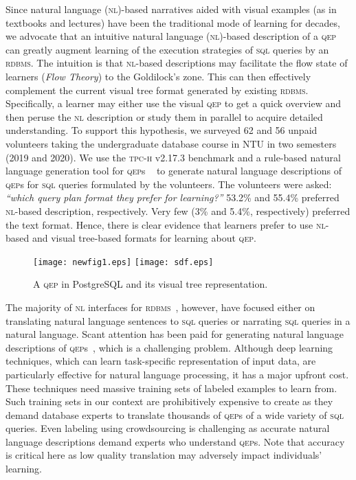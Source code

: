 \documentclass[11pt]{article}
\begin{document}
Since natural language (\textsc{nl})-based narratives aided with visual examples (as in textbooks and lectures) have been the traditional mode of learning for decades, we advocate that an  intuitive natural language (\textsc{nl})-based description of a \textsc{qep} can greatly augment learning of the execution strategies of \textsc{sql} queries by an \textsc{rdbms}. The intuition is that \textsc{nl}-based descriptions may facilitate the flow state of learners (\textit{Flow Theory}) to the Goldilock's zone. This can then effectively complement the current visual tree format generated by existing  \textsc{rdbms}.  Specifically, a learner may either use the visual \textsc{qep} to get a quick overview and then peruse the \textsc{nl} description or study them in parallel to acquire detailed understanding. To support this hypothesis, we surveyed 62 and 56 unpaid volunteers taking the undergraduate database course in NTU in two semesters (2019 and 2020).  We use the \textsc{tpc-h} v2.17.3 benchmark  and a  rule-based natural language generation tool for \textsc{qep}s ~\cite{neuron} to generate natural language descriptions of \textsc{qep}s for \textsc{sql} queries formulated by the volunteers.  The volunteers were asked: \textit{``which query plan format they prefer for learning?''} 53.2\% and 55.4\% preferred \textsc{nl}-based description, respectively. Very few (3\% and 5.4\%, respectively) preferred the text format. Hence, there is clear evidence that learners prefer to use \textsc{nl}-based and visual tree-based formats for learning about \textsc{qep}.

\begin{figure}[t]
\centering
\texttt{[image: newfig1.eps]}
\texttt{[image: sdf.eps]}
\vspace{0ex}\caption{A \textsc{qep} in PostgreSQL and its visual tree representation.}
\label{fig:plan}
\vspace{0ex}\end{figure}


The majority of \textsc{nl} interfaces for \textsc{rdbms}~\cite{KS+20}, however, have focused either on translating natural language sentences to \textsc{sql} queries or narrating \textsc{sql} queries in a natural language. Scant attention has been paid for generating natural language descriptions of \textsc{qep}s~\cite{neuron,lantern}, which is a challenging problem.
Although deep learning techniques, which can learn task-specific representation of input data, are particularly effective for natural language processing, it has a major upfront cost. These techniques need massive training sets  of labeled examples to learn from. Such training sets in our context are prohibitively expensive to create as they demand database experts to translate thousands of \textsc{qep}s of a wide variety of \textsc{sql} queries.  Even  labeling using crowdsourcing is challenging as accurate natural language descriptions demand experts who understand \textsc{qep}s. Note that accuracy is critical here as low quality translation may adversely impact individuals' learning.
\end{document}
